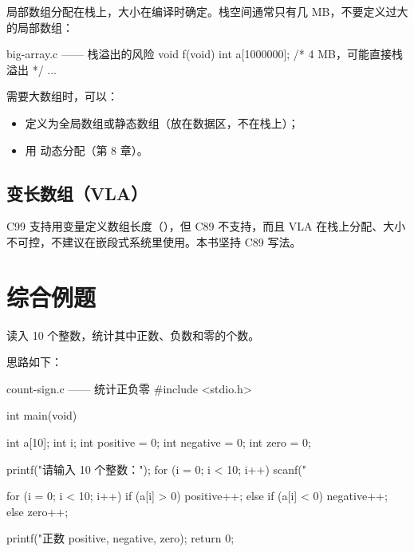 局部数组分配在栈上，大小在编译时确定。栈空间通常只有几 MB，不要定义过大的局部数组：

\begin{codebox}{big-array.c —— 栈溢出的风险}
void f(void)
{
    int a[1000000];   /* 4 MB，可能直接栈溢出 */
    ...
}
\end{codebox}

需要大数组时，可以：
\begin{itemize}
  \item 定义为全局数组或静态数组（放在数据区，不在栈上）；
  \item 用  动态分配（第 8 章）。
\end{itemize}

\subsection{变长数组（VLA）}

C99 支持用变量定义数组长度（），但 C89 不支持，而且 VLA 在栈上分配、大小不可控，不建议在嵌段式系统里使用。本书坚持 C89 写法。

\section{综合例题}

\begin{example}
读入 10 个整数，统计其中正数、负数和零的个数。
\end{example}
\begin{solution}
思路如下：

\begin{codebox}{count-sign.c —— 统计正负零}
#include <stdio.h>

int main(void)
{
    int a[10];
    int i;
    int positive = 0;
    int negative = 0;
    int zero = 0;

    printf("请输入 10 个整数：");
    for (i = 0; i < 10; i++) {
        scanf("%
    }

    for (i = 0; i < 10; i++) {
        if (a[i] > 0) {
            positive++;
        } else if (a[i] < 0) {
            negative++;
        } else {
            zero++;
        }
    }

    printf("正数 %
           positive, negative, zero);
    return 0;
}
\end{codebox}
\end{solution}

